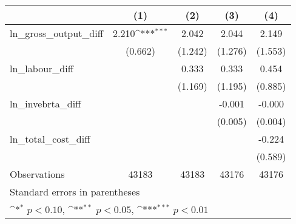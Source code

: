 {
\def\sym#1{\ifmmode^{#1}\else\(^{#1}\)\fi}
\begin{tabular}{l*{4}{c}}
\hline\hline
                &\multicolumn{1}{c}{(1)}         &\multicolumn{1}{c}{(2)}         &\multicolumn{1}{c}{(3)}         &\multicolumn{1}{c}{(4)}         \\
\hline
ln\_gross\_output\_diff&    2.210\sym{***}&    2.042         &    2.044         &    2.149         \\
                &  (0.662)         &  (1.242)         &  (1.276)         &  (1.553)         \\
[1em]
ln\_labour\_diff  &                  &    0.333         &    0.333         &    0.454         \\
                &                  &  (1.169)         &  (1.195)         &  (0.885)         \\
[1em]
ln\_invebrta\_diff&                  &                  &   -0.001         &   -0.000         \\
                &                  &                  &  (0.005)         &  (0.004)         \\
[1em]
ln\_total\_cost\_diff&                  &                  &                  &   -0.224         \\
                &                  &                  &                  &  (0.589)         \\
\hline
Observations    &    43183         &    43183         &    43176         &    43176         \\
\hline\hline
\multicolumn{5}{l}{\footnotesize Standard errors in parentheses}\\
\multicolumn{5}{l}{\footnotesize \sym{*} \(p<0.10\), \sym{**} \(p<0.05\), \sym{***} \(p<0.01\)}\\
\end{tabular}
}
